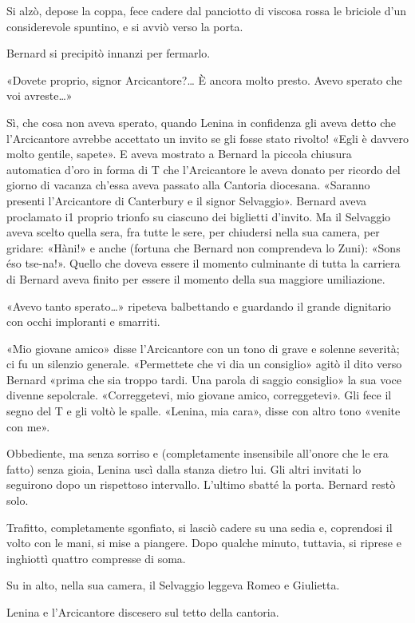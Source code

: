 \documentclass[
a5paper, %
10pt, %
twoside, 
onecolumn, %
openany, %
]{memoir}
\begin{document}
Si alzò, depose la coppa, fece cadere dal panciotto di viscosa rossa le briciole d’un considerevole spuntino, e si avviò verso la porta.

Bernard si precipitò innanzi per fermarlo.

«Dovete proprio, signor Arcicantore?… È ancora molto presto. Avevo sperato che voi avreste…»

Sì, che cosa non aveva sperato, quando Lenina in confidenza gli aveva detto che l’Arcicantore avrebbe accettato un invito se gli fosse stato rivolto! «Egli è davvero molto gentile, sapete». E aveva mostrato a Bernard la piccola chiusura automatica d’oro in forma di T che l’Arcicantore le aveva donato per ricordo del giorno di vacanza ch’essa aveva passato alla Cantoria diocesana. «Saranno presenti l’Arcicantore di Canterbury e il signor Selvaggio». Bernard aveva proclamato i1 proprio trionfo su ciascuno dei biglietti d’invito. Ma il Selvaggio aveva scelto quella sera, fra tutte le sere, per chiudersi nella sua camera, per gridare: «Hàni!» e anche (fortuna che Bernard non comprendeva lo Zuni): «Sons éso tse-na!». Quello che doveva essere il momento culminante di tutta la carriera di Bernard aveva finito per essere il momento della sua maggiore umiliazione.

«Avevo tanto sperato…» ripeteva balbettando e guardando il grande dignitario con occhi imploranti e smarriti.

«Mio giovane amico» disse l’Arcicantore con un tono di grave e solenne severità; ci fu un silenzio generale. «Permettete che vi dia un consiglio» agitò il dito verso Bernard «prima che sia troppo tardi. Una parola di saggio consiglio» la sua voce divenne sepolcrale. «Correggetevi, mio giovane amico, correggetevi». Gli fece il segno del T e gli voltò le spalle. «Lenina, mia cara», disse con altro tono «venite con me».

Obbediente, ma senza sorriso e (completamente insensibile all’onore che le era fatto) senza gioia, Lenina uscì dalla stanza dietro lui. Gli altri invitati lo seguirono dopo un rispettoso intervallo. L’ultimo sbatté la porta. Bernard restò solo.

Trafitto, completamente sgonfiato, si lasciò cadere su una sedia e, coprendosi il volto con le mani, si mise a piangere. Dopo qualche minuto, tuttavia, si riprese e inghiottì quattro compresse di soma.

Su in alto, nella sua camera, il Selvaggio leggeva Romeo e Giulietta.

Lenina e l’Arcicantore discesero sul tetto della cantoria.
\end{document}

